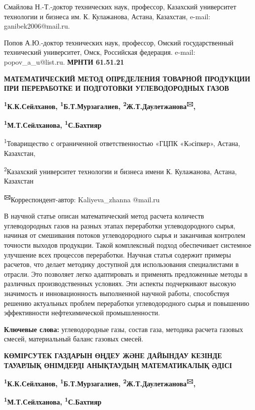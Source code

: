 Смайлова Н.-Т.-доктор технических наук, профессор, Казахский университет
технологии и бизнеса им. К. Кулажанова, Астана, Казахстан, e-mail:
ganibek2006@mail.ru.

Попов А.Ю.-доктор технических наук, профессор, Омский государственный
технический университет, Омск, Российская федерация. e-mail:
popov\_a\_u@list.ru.\newpage
{\bfseries МРНТИ 61.51.21}

{\bfseries МАТЕМАТИЧЕСКИЙ МЕТОД ОПРЕДЕЛЕНИЯ ТОВАРНОЙ ПРОДУКЦИИ ПРИ
ПЕРЕРАБОТКЕ И ПОДГОТОВКИ УГЛЕВОДОРОДНЫХ ГАЗОВ}

{\bfseries \textsuperscript{1}К.К.Сейлханов,
\textsuperscript{1}Б.Т.Мурзагалиев,
\textsuperscript{2}Ж.Т.Даулетжанова\textsuperscript{🖂},}

{\bfseries \textsuperscript{1}М.Т.Сейлханова, \textsuperscript{1}С.Бахтияр}

\textsuperscript{1}Товарищество с ограниченной ответственностью «ГЦПК
«Кəсіпкер», Астана, Казахстан,

\textsuperscript{2}Казахский университет технологии и бизнеса имени К.
Кулажанова, Астана, Казахстан

{\bfseries \textsuperscript{🖂}}Корреспондент-автор: Kaliyeva\_zhanna
@mail.ru

В научной статье описан математический метод расчета количеств
углеводородных газов на разных этапах переработки углеводородного сырья,
начиная от смешивания потоков углеводородного сырья и заканчивая
контролем точности выходов продукции. Такой комплексный подход
обеспечивает системное улучшение всех процессов переработки. Научная
статья содержит примеры расчетов, что делает методику доступной для
использования специалистами в отрасли. Это позволяет легко адаптировать
и применять предложенные методы в различных производственных условиях.
Эти аспекты подчеркивают высокую значимость и инновационность
выполненной научной работы, способствуя решению актуальных проблем
переработки углеводородного сырья и повышению эффективности
нефтехимической промышленности.

{\bfseries Ключевые слова:} углеводородные газы, состав газа, методика
расчета газовых смесей, материальный баланс газовых смесей.

{\bfseries КӨМІРСУТЕК ГАЗДАРЫН ӨҢДЕУ ЖӘНЕ ДАЙЫНДАУ КЕЗІНДЕ ТАУАРЛЫҚ
ӨНІМДЕРДІ АНЫҚТАУДЫҢ МАТЕМАТИКАЛЫҚ ӘДІСІ}

{\bfseries \textsuperscript{1}К.К.Сейлханов,
\textsuperscript{1}Б.Т.Мурзагалиев,
\textsuperscript{2}Ж.Т.Даулетжанова\textsuperscript{🖂},}

{\bfseries \textsuperscript{1}М.Т.Сейлханова, \textsuperscript{1}С.Бахтияр}

